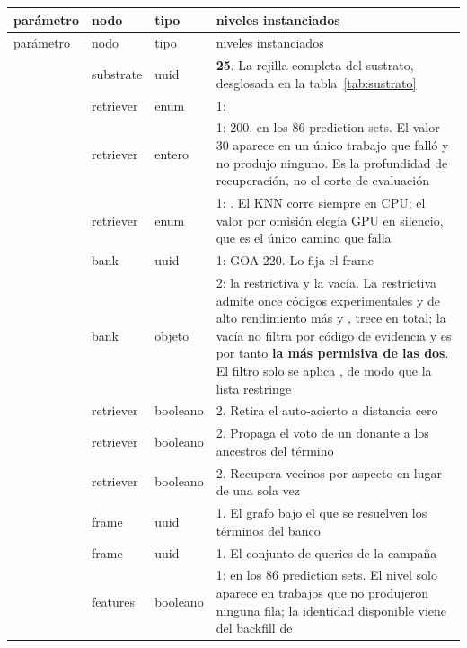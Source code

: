 \begin{center}
\small
\begin{longtable}{@{}L{4.9cm} L{1.6cm} L{1.6cm} L{5.6cm}@{}}
\toprule
parámetro & nodo & tipo & niveles instanciados\\
\midrule
\endfirsthead
\toprule
parámetro & nodo & tipo & niveles instanciados\\
\midrule
\endhead
{}      & substrate & uuid    & \textbf{25}. La rejilla completa del sustrato, desglosada en la tabla~\ref{tab:sustrato}\\
                     & retriever & enum    & 1: \\
          & retriever & entero  & 1: 200, en los 86 prediction sets. El valor 30 aparece en un único trabajo que falló y no produjo ninguno. Es la profundidad de recuperación, no el corte de evaluación\\
            & retriever & enum    & 1: . El KNN corre siempre en CPU; el valor por omisión  elegía GPU en silencio, que es el único camino que falla\\
        & bank      & uuid    & 1: GOA 220. Lo fija el frame\\
              & bank      & objeto  & 2: la restrictiva y la vacía. La restrictiva admite once códigos experimentales y de alto rendimiento más  y , trece en total; la vacía no filtra por código de evidencia y es por tanto \textbf{la más permisiva de las dos}. El filtro solo se aplica , de modo que la lista restringe\\
   & retriever & booleano& 2. Retira el auto-acierto a distancia cero\\
& retriever& booleano& 2. Propaga el voto de un donante a los ancestros del término\\
     & retriever & booleano& 2. Recupera vecinos por aspecto en lugar de una sola vez\\
     & frame     & uuid    & 1. El grafo bajo el que se resuelven los términos del banco\\
             & frame     & uuid    & 1. El conjunto de queries de la campaña\\
        & features  & booleano& 1:  en los 86 prediction sets. El nivel  solo aparece en trabajos que no produjeron ninguna fila; la identidad disponible viene del backfill de \\

\end{longtable}
\end{center}
